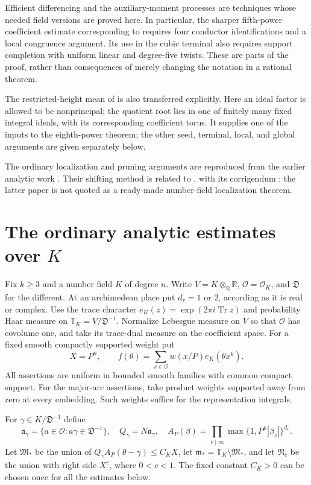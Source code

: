 \documentclass[11pt,reqno]{amsart}
\numberwithin{equation}{section}
\theoremstyle{definition}
\begin{document}
Efficient differencing and the auxiliary-moment processes
\cite{WooleyThesis,Wooley1992,VW1995,VW2000} are techniques whose needed
field versions are proved here.  In particular, the sharper fifth-power
coefficient estimate corresponding to \cite[Lemma~4.3]{VW1995} requires
four conductor identifications and a local congruence argument.
Its use in the cubic terminal also requires support completion with uniform
linear and degree-five twists.  These are parts of the proof, rather than
consequences of merely changing the notation in a rational theorem.

The restricted-height mean of \cite[Theorem~4.2]{BW2023} is also transferred
explicitly.  Here an ideal factor is allowed to be nonprincipal; the quotient
root lies in one of finitely many fixed integral ideals, with its corresponding
coefficient torus.  It supplies one of the inputs to the eighth-power theorem; the other
seed, terminal, local, and global arguments are given separately below.

The ordinary localization and pruning arguments are reproduced from the
earlier analytic work \cite{ProjectAnalytic}.  Their shifting method is
related to \cite[Theorem~2.1]{Wooley2012}, with its corrigendum
\cite{WooleyCorr}; the latter paper is not quoted as a ready-made
number-field localization theorem.
\section{The ordinary analytic estimates over \texorpdfstring{$K$}{K}}
\label{sec:ordinary-bundle}

Fix $k\ge3$ and a number field $K$ of degree $n$.
Write $V=K\otimes_{\mathbb Q}\mathbb R$, $\mathcal O=\mathcal O_K$,
and $\mathfrak D$ for the different.
At an archimedean place put $d_v=1$ or $2$, according as it is real or complex.
Use the trace character $e_K(z)=\exp(2\pi i\operatorname{Tr}z)$ and probability
Haar measure on $\mathbb T_K=V/\mathfrak D^{-1}$.
Normalize Lebesgue measure on $V$ so that $\mathcal O$ has covolume one,
and take its trace-dual measure on the coefficient space.
For a fixed smooth compactly supported weight put
\[
 X=P^n,\qquad f(\theta)=\sum_{x\in\mathcal O}w(x/P)e_K(\theta x^k).
\]
All assertions are uniform in bounded smooth families with common compact support.
For the major-arc assertions, take product weights supported away from zero
at every embedding.  Such weights suffice for the representation integrals.

For $\gamma\in K/\mathfrak D^{-1}$ define
\[
 \mathfrak a_\gamma=\{a\in\mathcal O:a\gamma\in\mathfrak D^{-1}\},
 \quad Q_\gamma=N\mathfrak a_\gamma,
 \quad A_P(\beta)=\prod_{v\mid\infty}\max\{1,P^k|\beta_v|\}^{d_v}.
\]
Let $\mathfrak M_*$ be the union of
$Q_\gamma A_P(\theta-\gamma)\le C_KX$, let
$\mathfrak m_*=\mathbb T_K\setminus\mathfrak M_*$, and let
$\mathfrak N_c$ be the union with right side $X^c$, where $0<c<1$.
The fixed constant $C_K>0$ can be chosen once for all the estimates below.
\end{document}
